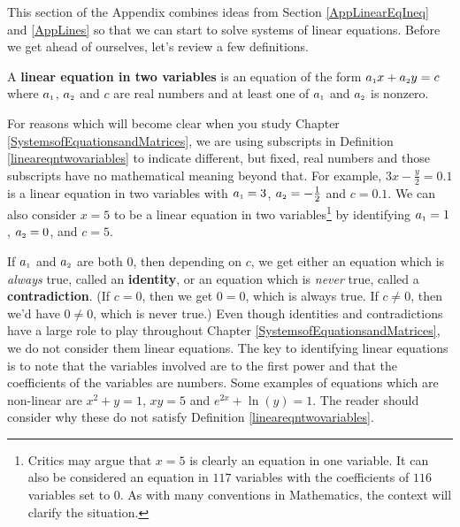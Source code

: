 

\setcounter{footnote}{0}

\label{AppLinearSystems}

\setlength{\extrarowheight}{0pt}

This section of the Appendix combines ideas from Section \ref{AppLinearEqIneq} and \ref{AppLines} so that we can start to solve systems of linear equations.  Before we get ahead of ourselves, let's review a few definitions.

\begin{tcolorbox}
    
\begin{defn}  \label{lineareqntwovariables}  A \textbf{linear equation in two variables} is an equation of the form $a_{\mbox{\tiny$1$}} x + a_{\mbox{\tiny$2$}} y = c$ where $a_{\mbox{\tiny$1$}}$, $a_{\mbox{\tiny$2$}}$ and $c$ are real numbers and at least one of $a_{\mbox{\tiny$1$}}$ and $a_{\mbox{\tiny$2$}}$ is nonzero.

\end{defn}

\end{tcolorbox}

For reasons which will become clear when you study Chapter \ref{SystemsofEquationsandMatrices}, we are using subscripts in Definition \ref{lineareqntwovariables} to indicate different, but fixed, real numbers and those subscripts have no mathematical meaning beyond that.  For example, $3x - \frac{y}{2} = 0.1$ is a linear equation in two variables with $a_{\mbox{\tiny$1$}} = 3$, $a_{\mbox{\tiny$2$}} = -\frac{1}{2}$ and $c = 0.1$.  We can also consider $x = 5$ to be a linear equation in two variables\footnote{Critics may argue that $x=5$ is clearly an equation in one variable.  It can also be considered an equation in $117$ variables with the coefficients of $116$ variables set to $0$.  As with many conventions in Mathematics, the context will clarify the situation.} by identifying $a_{\mbox{\tiny$1$}} = 1$, $a_{\mbox{\tiny$2$}} = 0$, and $c = 5$.  

If $a_{\mbox{\tiny$1$}}$ and $a_{\mbox{\tiny$2$}}$ are both $0$, then depending on $c$, we get either an equation which is \textit{always} true, called an \textbf{identity}, or an equation which is \textit{never} true, called a \textbf{contradiction}. (If $c = 0$, then we get $0 = 0$, which is always true.  If $c \neq 0$, then we'd have  $0 \neq 0$, which is never true.)  Even though identities and contradictions have a large role to play throughout Chapter \ref{SystemsofEquationsandMatrices}, we do not consider them linear equations.  The key to identifying linear equations is to note that the variables involved are to the first power and that the coefficients of the variables are numbers.  Some examples of equations which are non-linear are $x^2 + y = 1$, $xy = 5$ and $e^{2x} + \ln(y) = 1$.  The reader should consider why these do not satisfy Definition \ref{lineareqntwovariables}.  


